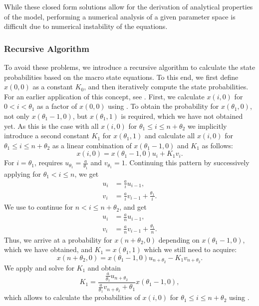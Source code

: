 While these closed form solutions allow for the derivation of analytical properties of the model, performing a numerical analysis of a given parameter space is difficult due to numerical instability of the equations.

\subsubsection*{Recursive Algorithm}
To avoid these problems, we introduce a recursive algorithm to calculate the state probabilities based on the macro state equations.
To this end, we first define \(x(0,0)\) as a constant \(K_0\), and then iteratively compute the state probabilities.
For an earlier application of this concept, see \cite{Trangia1997}.
First, we calculate \(x(i,0)\) for \(0<i<\theta_1\) as a factor of \(x(0,0)\) using .
To obtain the probability for \(x(\theta_1,0)\), not only \(x(\theta_1 -1, 0)\), but \(x(\theta_1, 1)\) is required, which we have not obtained yet.
As this is the case with all \(x(i,0)\) for \(\theta_1 \leq i \leq n + \theta_2\) we implicitly introduce a second constant \(K_1\) for \(x(\theta_1, 1)\) and calculate all \(x(i,0)\) for \(\theta_1 \leq i \leq n + \theta_2\) as a linear combination of \(x(\theta_1 - 1,0)\) and \(K_1\) as follows:
\begin{equation}
x(i, 0) = x(\theta_1 - 1, 0) u_i + K_1 v_i.\label{eq:cloud:data_centers:modeling:closed_form_solution:linear_combination}
\end{equation}
For \(i = \theta_1\),  requires \(u_{\theta_1} = \frac{a}{\theta_1}\) and \(v_{\theta_1} = 1\).
Continuing this pattern by successively applying  for \(\theta_1 < i \leq n\), we get
\begin{align*}
u_i &= \frac{a}{i}u_{i-1},\\
v_i &= \frac{a}{i}v_{i-1} + \frac{\theta_1}{i}.
\end{align*}
We use  to continue for \(n < i \leq n + \theta_2\), and get
\begin{align*}
u_i &= \frac{a}{n}u_{i-1},\\
v_i &= \frac{a}{n}v_{i-1} + \frac{\theta_1}{n}.
\end{align*}
Thus, we arrive at a probability for \(x(n + \theta_2,0)\) depending on \(x(\theta_1 -1,0)\), which we have obtained, and \(K_1 = x(\theta_1,1)\) which we still need to acquire:
\begin{equation*}
x(n+\theta_2,0) = x(\theta_1 -1,0) u_{n+\theta_2} - K_1 v_{n+\theta_2}.
\end{equation*}
We apply  and solve for \(K_1\) and obtain
\begin{equation*}
K_1 =  \frac{\frac{a}{\theta_1} u_{n+\theta_2}}{\frac{a}{\theta_1} v_{n + \theta_2} + \theta_1} x(\theta_1 - 1, 0),
\end{equation*}
which allows to calculate the probabilities of \(x(i,0)\) for \(\theta_1 \leq i \leq n + \theta_2\) using .

